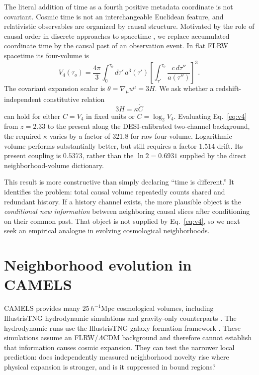 \documentclass[10pt,twocolumn]{article}
\newcommand{\LCDM}{$\Lambda$CDM}
\begin{document}
The literal addition of time as a fourth positive metadata coordinate is not
covariant.  Cosmic time is not an interchangeable Euclidean feature, and
relativistic observables are organized by causal structure.  Motivated by the
role of causal order in discrete approaches to spacetime \citep{Surya2019}, we
replace accumulated coordinate time by the causal past of an observation event.
In flat FLRW spacetime its four-volume is
\begin{equation}
 V_4(\tau_o)=\frac{4\pi}{3}\int_0^{\tau_o}\!d\tau'\,a^3(\tau')
 \left[\int_{\tau'}^{\tau_o}\frac{c\,d\tau''}{a(\tau'')}\right]^3.
 \label{eq:v4}
\end{equation}
The covariant expansion scalar is $\theta=\nabla_\mu u^\mu=3H$.  We ask
whether a redshift-independent constitutive relation
\begin{equation}
 3H=\kappa\dot C
 \label{eq:kappa}
\end{equation}
can hold for either $C=V_4$ in fixed units or $C=\log_2V_4$.  Evaluating
Eq.~\eqref{eq:v4} from $z=2.33$ to the present along the DESI-calibrated
two-channel background, the required $\kappa$ varies by a factor of 321.8 for
raw four-volume.  Logarithmic volume performs substantially better, but still
requires a factor 1.514 drift.  Its present coupling is $0.5373$, rather than
the $\ln2=0.6931$ supplied by the direct neighborhood-volume dictionary.

This result is more constructive than simply declaring ``time is different.''
It identifies the problem: total causal volume repeatedly counts shared and
redundant history.  If a history channel exists, the more plausible object is
the \emph{conditional new information} between neighboring causal slices after
conditioning on their common past.  That object is not supplied by
Eq.~\eqref{eq:v4}, so we next seek an empirical analogue in evolving
cosmological neighborhoods.

\section{Neighborhood evolution in CAMELS}

CAMELS provides many $25\,h^{-1}\mathrm{Mpc}$ cosmological volumes, including
IllustrisTNG hydrodynamic simulations and gravity-only counterparts
\citep{CAMELS2021,CAMELSRelease2022}.  The hydrodynamic runs use the
IllustrisTNG galaxy-formation framework \citep{Pillepich2018}.  These
simulations assume an FLRW/\LCDM{} background and therefore cannot establish
that information causes cosmic expansion.  They can test the narrower local
prediction: does independently measured neighborhood novelty rise where
physical expansion is stronger, and is it suppressed in bound regions?
\end{document}
